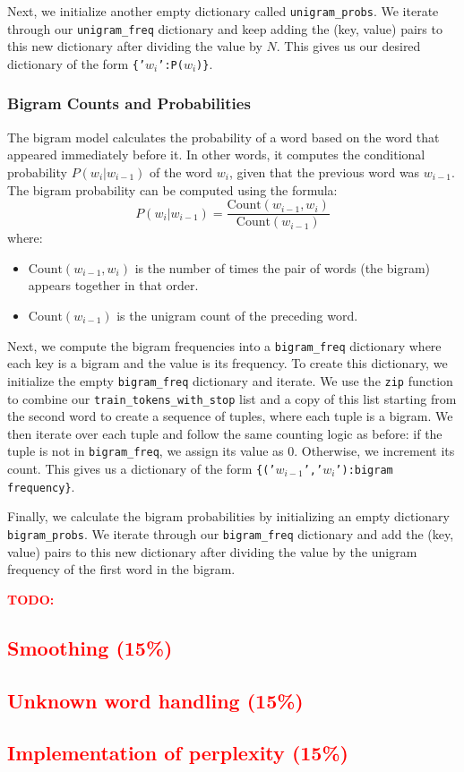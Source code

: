 \documentclass[a4paper]{article}
\newcommand{\todo}[1]{\textcolor{red}{\textbf{TODO:} #1}}
\begin{document}
Next, we initialize another empty dictionary called \texttt{unigram\_probs}. We iterate through our \texttt{unigram\_freq} dictionary and keep adding the (key, value) pairs to this new dictionary after dividing the value by $N$. This gives us our desired dictionary of the form \texttt{\{'$w_i$':P($w_i$)\}}.

\subsubsection{Bigram Counts and Probabilities}
The bigram model calculates the probability of a word based on the word that appeared immediately before it. In other words, it computes the conditional probability $P(w_i | w_{i-1})$ of the word $w_i$, given that the previous word was $w_{i-1}$. The bigram probability can be computed using the formula:
\[ P(w_i | w_{i-1}) = \frac{\text{Count}(w_{i-1}, w_i)}{\text{Count}(w_{i-1})} \]
where:
\begin{itemize}
    \item $\text{Count}(w_{i-1}, w_i)$ is the number of times the pair of words (the bigram) appears together in that order.
    \item $\text{Count}(w_{i-1})$ is the unigram count of the preceding word.
\end{itemize}

Next, we compute the bigram frequencies into a \texttt{bigram\_freq} dictionary where each key is a bigram and the value is its frequency. To create this dictionary, we initialize the empty \texttt{bigram\_freq} dictionary and iterate. We use the \texttt{zip} function to combine our \texttt{train\_tokens\_with\_stop} list and a copy of this list starting from the second word to create a sequence of tuples, where each tuple is a bigram. We then iterate over each tuple and follow the same counting logic as before: if the tuple is not in \texttt{bigram\_freq}, we assign its value as 0. Otherwise, we increment its count. This gives us a dictionary of the form \texttt{\{('$w_{i-1}$','$w_i$'):bigram frequency\}}.

Finally, we calculate the bigram probabilities by initializing an empty dictionary \texttt{bigram\_probs}. We iterate through our \texttt{bigram\_freq} dictionary and add the (key, value) pairs to this new dictionary after dividing the value by the unigram frequency of the first word in the bigram.


\todo{
    \subsection{Smoothing (15\%)}
    \subsection{Unknown word handling (15\%)}
    \subsection{Implementation of perplexity (15\%)}
}
\end{document}
